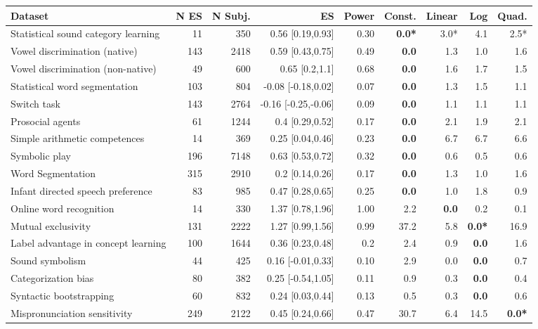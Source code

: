 \documentclass[10pt, letterpaper]{article}
\begin{document}
\begin{table}[ht]
\small
\begin{tabular}{l|r|r|r|r|r|r|r|r}
\hline
\textbf{Dataset} & N ES & N Subj. & ES & Power & Const. & Linear & Log & Quad.\\
\hline
Statistical sound category learning  & 11 & 350 & 0.56 [0.19,0.93] & 0.30 & \textbf{0.0*} & 3.0* & 4.1 & 2.5*\\
Vowel discrimination (native) & 143 & 2418 & 0.59 [0.43,0.75] & 0.49 & \textbf{0.0} & 1.3 & 1.0 & 1.6\\
Vowel discrimination (non-native) & 49 & 600 & 0.65 [0.2,1.1] & 0.68 &\textbf{0.0} & 1.6 & 1.7 & 1.5\\
Statistical word segmentation & 103 & 804 & -0.08 [-0.18,0.02] & 0.07 & \textbf{0.0} & 1.3 & 1.5 & 1.1\\
Switch task & 143 & 2764 & -0.16 [-0.25,-0.06] & 0.09 & \textbf{0.0}  & 1.1 & 1.1 & 1.1\\
Prosocial agents & 61 & 1244 & 0.4 [0.29,0.52] & 0.17 & \textbf{0.0}  & 2.1 & 1.9 & 2.1\\
Simple arithmetic competences & 14 & 369 & 0.25 [0.04,0.46] & 0.23 & \textbf{0.0} & 6.7 & 6.7 & 6.6\\
Symbolic play & 196 & 7148 & 0.63 [0.53,0.72] & 0.32 & \textbf{0.0} & 0.6 & 0.5 & 0.6\\
Word Segmentation  & 315 & 2910 & 0.2 [0.14,0.26] & 0.17 & \textbf{0.0} & 1.3 & 1.0 & 1.6\\
Infant directed speech preference & 83 & 985 & 0.47 [0.28,0.65] & 0.25 & \textbf{0.0} & 1.0 & 1.8 & 0.9\\
Online word recognition & 14 & 330 & 1.37 [0.78,1.96] & 1.00 & 2.2 & \textbf{0.0} & 0.2 & 0.1\\
\rowcolor{lightgray}Mutual exclusivity & 131 & 2222 & 1.27 [0.99,1.56] & 0.99 & 37.2 & 5.8 & \textbf{0.0*} & 16.9\\
Label advantage in concept learning & 100 & 1644 & 0.36 [0.23,0.48] & 0.2 & 2.4 & 0.9 & \textbf{0.0} & 1.6\\
Sound symbolism & 44 & 425 & 0.16 [-0.01,0.33] & 0.10 & 2.9 & 0.0 & \textbf{0.0} & 0.7\\
Categorization bias & 80 & 382 & 0.25 [-0.54,1.05] & 0.11 & 0.9 & 0.3 & \textbf{0.0} & 0.4\\
Syntactic bootstrapping & 60 & 832 & 0.24 [0.03,0.44] & 0.13 & 0.5 & 0.3 & \textbf{0.0} & 0.6\\
\rowcolor{lightgray}Mispronunciation sensitivity & 249 & 2122 & 0.45 [0.24,0.66] & 0.47 & 30.7 & 6.4 & 14.5 & \textbf{0.0*}\\

\end{tabular}
\end{table}
\end{document}
